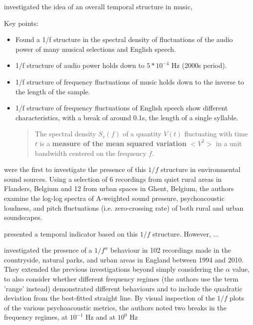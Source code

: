 \cite{Jeon2011Non} investigated the idea of an overall temporal structure in music,

Key points:
\begin{itemize}
  \item Found a 1/f structure in the spectral density of fluctuations of the audio power of many musical selections and English speech.
  \item 1/f structure of audio power holds down to $5 * 10^{-4}$ Hz (2000s period).
  \item 1/f structure of frequency fluctuations of music holds down to the inverse to the length of the sample.
  \item 1/f structure of frequency fluctuations of English speech show different characteristics, with a break of around 0.1s, the length of a single syllable.
        \begin{quote}
          The spectral density $S_v(f)$ of a quantity $V(t)$ fluctuating with time $t$ is a \textbf{measure of the mean squared variation} $<V^2>$ in a unit bandwidth centered on the frequency $f$.
        \end{quote}


\end{itemize}


\citet{deCoensel20031f} were the first to investigate the presence of this $1/f$ structure in environmental sound sources. Using a selection of 6 recordings from quiet rural areas in Flanders, Belgium and 12 from urban spaces in Ghent, Belgium, the authors examine the log-log spectra of A-weighted sound pressure, psychoacoustic loudness, and pitch fluctuations (i.e. zero-crossing rate) of both rural and urban soundscapes.




\cite{Botteldooren2006temporal} presented a temporal indicator based on this \(1/f\) structure. However, ...

\citet{Yang2015Presence} investigated the presence of a $1/f^{\alpha}$ behaviour in 102 recordings made in the countryside, natural parks, and urban areas in England between 1994 and 2010. They extended the previous investigations beyond simply considering the $\alpha$ value, to also consider whether different frequency regimes (the authors use the term 'range' instead) demonstrated different behaviours and to include the quadratic deviation from the best-fitted straight line. By visual inspection of the $1/f$ plots of the various psychoacoustic metrics, the authors noted two breaks in the frequency regimes, at $10^{-1}$ Hz and at $10^0$ Hz

